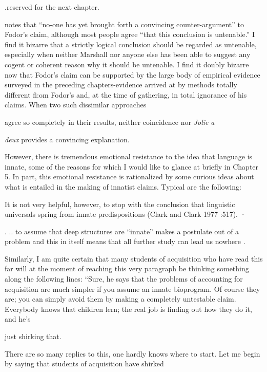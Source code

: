 .reserved for the next chapter.


\citet{Marshall1979} notes that ``no-one has yet brought forth a convincing counter-argument'' to Fodor's claim, although most people agree ``that this conclusion is untenable.'' I find it bizarre that a strictly logical conclusion should be regarded as untenable, especially when neither Marshall nor anyone else has been able to suggest any cogent or coherent reason why it should be untenable. I find it doubly bizarre now that Fodor's claim can be supported by the large body of empirical evidence surveyed in the preceding chapters-evidence arrived at by methods totally different fi:om Fodor's and, at the time of gathering, in total ignorance of his claims. When two such dissimilar approaches

agree so completely in their results, neither coincidence nor \textit{Jolie }\textit{a}

\textit{deux} provides a convincing explanation.

However, there is tremendous emotional resistance to the idea that language is innate, some of the reasons for which I would like to glance at briefly in Chapter 5. In part, this emotional resistance is rationalized by some curious ideas about what is entailed in the making of innatist claims. Typical are the following:

It is not very helpful, however, to stop with the conclu\-sion that linguistic universals spring from innate predisposi\-tions (Clark and Clark 1977 :517). ·

. .. to assume that deep structures are ``innate'' makes a postulate out of a problem and this in itself means that all further study can lead us nowhere \citep[383]{Luria1975}.

Similarly, I am quite certain that many students of acquisition who have read this far will at the moment of reaching this very para\-graph be thinking something along the following lines: ``Sure, he says that the problems of accounting for acquisition are much simpler if you assume an innate bioprogram. Of course they are; you can simply avoid them by making a completely untestable claim. Everybody knows that children lern; the real job is finding out how they do it, and he's

just shirking that.{\textquotedbl}


There are so many replies to this, one hardly knows where to start. Let me begin by saying that students of acquisition have shirked

